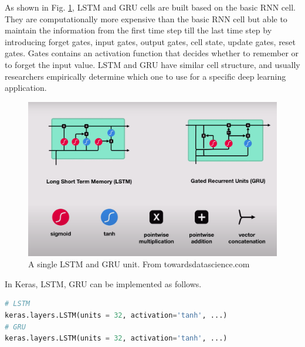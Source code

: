 As shown in Fig. \ref{fig_LSTM_GRU}, LSTM and GRU cells are built based on the basic RNN cell. They are computationally more expensive than the basic RNN cell but able to maintain the information from the first time step till the last time step by introducing forget gates, input gates, output gates, cell state, update gates, reset gates. Gates contains an activation function that decides whether to remember or to forget the input value. LSTM and GRU have similar cell structure, and usually researchers empirically determine which one to use for a specific deep learning application.
\begin{figure}[h!]
\begin{center}
\includegraphics[width = 13cm]{img/LSTM_GRU.png}
\caption{A single LSTM and GRU unit. From towardsdatascience.com \label{fig_LSTM_GRU}}
\end{center}
\end{figure}

In Keras, LSTM, GRU can be implemented as follows.
\begin{lstlisting}[language=python,frame=single]
# LSTM
keras.layers.LSTM(units = 32, activation='tanh', ...)
# GRU
keras.layers.LSTM(units = 32, activation='tanh', ...)
\end{lstlisting}
